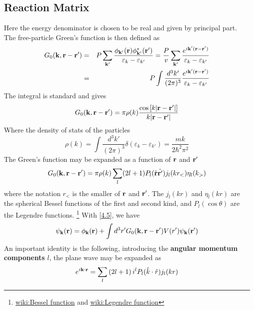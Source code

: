\subsection{Reaction Matrix}
Here the energy denominator is chosen to be real and given by principal part.
The free-particle Green's function is then defined as
\begin{eqnarray}
    G_0(\mathbf{k},\mathbf{r}-\mathbf{r}') &=& P \sum_{\mathbf{k}'} \frac{\phi_{\mathbf{k}'}(\mathbf{r}) \phi^*_{\mathbf{k}'}(\mathbf{r}')}{\varepsilon_k - \varepsilon_{k'}} = \frac{P}{v} \sum_{\mathbf{k}'} \frac{e^{i\mathbf{k}'(\mathbf{r}-\mathbf{r}')}}{\varepsilon_k - \varepsilon_{k'}}    \label{4.13} \\
    &=& P \int \frac{d^3 k'}{(2\pi)^3} \frac{e^{i\mathbf{k}'(\mathbf{r}-\mathbf{r}')}}{\varepsilon_k - \varepsilon_{k'}}     \label{4.14}
\end{eqnarray}
The integral is standard and gives
\begin{equation}
    G_0(\mathbf{k},\mathbf{r}-\mathbf{r}') = \pi \rho(k) \frac{\cos \left[k \abs{\mathbf{r}-\mathbf{r}'} \right]}{k\abs{\mathbf{r}-\mathbf{r}'}}     \label{4.15}
\end{equation}
Where the density of stats of the particles
\begin{equation}
    \rho(k) = \int \frac{d^3 k'}{(2\pi)^3} \delta(\varepsilon_k - \varepsilon_{k'})   = \frac{mk}{2\hbar^2 \pi^2}   \label{4.16}
\end{equation}
The Green's function may be expanded as a function of $\mathbf{r}$ and $\mathbf{r}'$
\begin{equation}
    G_0(\mathbf{k},\mathbf{r}-\mathbf{r}') = \pi \rho(k) \sum_l (2l+1) P_l(\hat{\mathbf{r}}\hat{\mathbf{r}'}) j_l(k r_<) \eta_l(k_>)    \label{4.17}
\end{equation}
where the notation $r_<$ is the smaller of $\mathbf{r}$ and $\mathbf{r}'$.
The $j_l(kr)$ and $\eta_l(kr)$ are the spherical Bessel functions of the first and second kind, and $P_l(\cos \theta)$ are the Legendre functions.
\footnote{
\href{https://en.wikipedia.org/wiki/Bessel_function}{wiki:Bessel function} and
\href{https://en.wikipedia.org/wiki/Legendre_function}{wiki:Legendre function}
}
With \eqref{4.5}, we have
\begin{equation}
    \psi_{\mathbf{k}}(\mathbf{r}) = \phi_{\mathbf{k}}(\mathbf{r}) + \int d^3 r' G_0(\mathbf{k},\mathbf{r}-\mathbf{r}') V(r') \psi_{\mathbf{k}}(\mathbf{r}')  \label{4.18}
\end{equation}
An important identity is the following, introducing the \textbf{angular momentum components $l$}, the plane wave may be expanded as
\begin{equation}
    e^{i\mathbf{k}\cdot \mathbf{r}} = \sum_{l} \left( 2l+1 \right) i^l P_l(\hat{k}\cdot \hat{r}) j_l(kr)  \label{4.19}
\end{equation}
